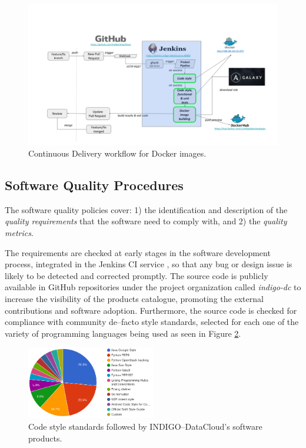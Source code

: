 \documentclass[journal]{IEEEtran}
\begin{document}
\begin{figure}[ht]
\centering
\includegraphics[width=\textwidth]{images/devops.png}
\caption{Continuous Delivery workflow for Docker images.}
\label{fig:fig_CD}
\end{figure}


\subsection{Software Quality Procedures}

The software quality policies \cite{indigo-d31} cover: 1) the identification
and description of the \emph{quality requirements} that the software need to
comply with, and 2) the \emph{quality metrics}.

The requirements are checked at early stages in the software development
process, integrated in the Jenkins CI service \cite{indigo-jenkins}, so that any
bug or design issue is likely to be detected and corrected promptly. The source
code is publicly available in GitHub repositories under the project organization called
{\sl indigo-dc} \cite{indigo-github} to increase the visibility of the products
catalogue, promoting the external contributions and software adoption. Furthermore,
the source code is checked for compliance with community de--facto style standards,
selected for each one of the variety of programming languages being used as seen in
Figure \ref{fig:fig_codestyle}.

\begin{figure}[ht]
\centering
\includegraphics[width=0.5\textwidth]{images/codestyle.png}
\caption{Code style standards followed by INDIGO--DataCloud's software products.}
\label{fig:fig_codestyle}
\end{figure}
\end{document}
